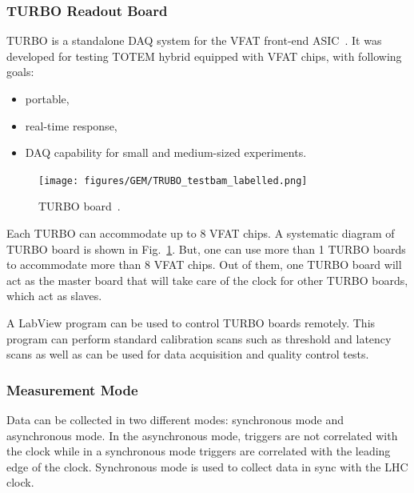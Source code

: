 
\subsubsection{TURBO Readout Board} %
\label{ssub:turbo_readout_board}
TURBO is a standalone DAQ system for the VFAT front-end ASIC~\cite{Paschalis2011}. It was developed for testing TOTEM hybrid equipped with VFAT chips, with following goals:
\begin{itemize}
    \item portable,
    \item real-time response,
    \item DAQ capability for small and medium-sized experiments.
\end{itemize}
\begin{figure}[htbp]
    \centering
    \texttt{[image: figures/GEM/TRUBO\_testbam\_labelled.png]}
    \caption{TURBO board~\cite{Paschalis2011}.}
    \label{fig:turbo}
\end{figure}
Each TURBO can accommodate up to 8 VFAT chips. 
A systematic diagram of TURBO board is shown in Fig.~\ref{fig:turbo}. 
But, one can use more than 1 TURBO boards to accommodate more than 8 VFAT chips. 
Out of them, one TURBO board will act as the master board that will take care of the clock for other TURBO boards, which act as slaves.

A LabView program can be used to control TURBO boards remotely. 
This program can perform standard calibration scans such as threshold and latency scans as well as can be used for data acquisition and quality control tests.


\subsubsection{Measurement Mode} %
\label{ssub:measurement_mode}
Data can be collected in two different modes: synchronous mode and asynchronous mode. In the asynchronous mode, triggers are not correlated with the clock while in a synchronous mode triggers are correlated with the leading edge of the clock. Synchronous mode is used to collect data in sync with the LHC clock.

